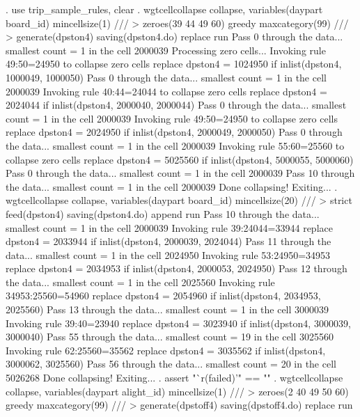 {\medskip}
. use trip_sample_rules, clear
{\smallskip}
. wgtcellcollapse collapse, variables(daypart board_id) mincellsize(1) ///
>         zeroes(39 44 49 60) greedy maxcategory(99) ///
>         generate(dpston4) saving(dpston4.do) replace run
Pass 0 through the data...
  smallest count = 1 in the cell      2000039
{\smallskip}
Processing zero cells...
{\smallskip}
  Invoking rule 49:50=24950 to collapse zero cells
  replace dpston4 = 1024950 if inlist(dpston4, 1000049, 1000050)
Pass 0 through the data...
  smallest count = 1 in the cell      2000039
  Invoking rule 40:44=24044 to collapse zero cells
  replace dpston4 = 2024044 if inlist(dpston4, 2000040, 2000044)
Pass 0 through the data...
  smallest count = 1 in the cell      2000039
  Invoking rule 49:50=24950 to collapse zero cells
  replace dpston4 = 2024950 if inlist(dpston4, 2000049, 2000050)
\smallskip
\oom
\smallskip
Pass 0 through the data...
  smallest count = 1 in the cell      2000039
  Invoking rule 55:60=25560 to collapse zero cells
  replace dpston4 = 5025560 if inlist(dpston4, 5000055, 5000060)
Pass 0 through the data...
  smallest count = 1 in the cell      2000039
Pass 10 through the data...
  smallest count = 1 in the cell      2000039
  Done collapsing! Exiting...
{\smallskip}
. wgtcellcollapse collapse, variables(daypart board_id) mincellsize(20) ///
>         strict feed(dpston4) saving(dpston4.do) append run
Pass 10 through the data...
  smallest count = 1 in the cell      2000039
  Invoking rule 39:24044=33944
  replace dpston4 = 2033944 if inlist(dpston4, 2000039, 2024044)
Pass 11 through the data...
  smallest count = 1 in the cell      2024950
  Invoking rule 53:24950=34953
  replace dpston4 = 2034953 if inlist(dpston4, 2000053, 2024950)
Pass 12 through the data...
  smallest count = 1 in the cell      2025560
  Invoking rule 34953:25560=54960
  replace dpston4 = 2054960 if inlist(dpston4, 2034953, 2025560)
Pass 13 through the data...
  smallest count = 1 in the cell      3000039
  Invoking rule 39:40=23940
  replace dpston4 = 3023940 if inlist(dpston4, 3000039, 3000040)
\smallskip
\oom
\smallskip
Pass 55 through the data...
  smallest count = 19 in the cell      3025560
  Invoking rule 62:25560=35562
  replace dpston4 = 3035562 if inlist(dpston4, 3000062, 3025560)
Pass 56 through the data...
  smallest count = 20 in the cell      5026268
  Done collapsing! Exiting...
{\smallskip}
. assert "`r(failed)'" == ""
{\smallskip}
\cnp
. wgtcellcollapse collapse, variables(daypart alight_id) mincellsize(1) ///
>         zeroes(2 40 49 50 60) greedy maxcategory(99) ///
>         generate(dpstoff4) saving(dpstoff4.do) replace run
